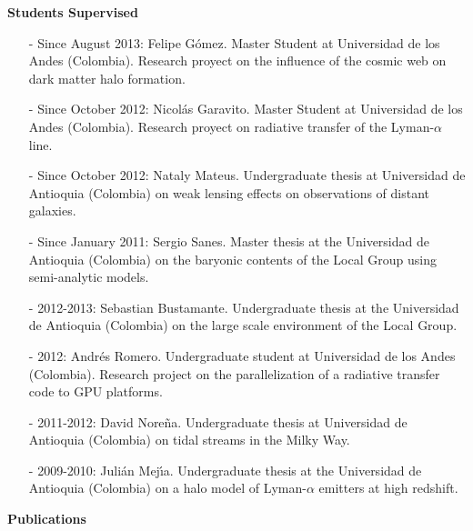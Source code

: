 \documentclass[9pt]{article}
\begin{document}
{\bf Students Supervised}
\begin{itemize}

\item[-] Since August 2013: Felipe G\'omez. Master Student at
  Universidad de los Andes (Colombia). Research proyect on the
  influence of the cosmic web on dark matter halo formation. 
\item[-] Since October 2012: Nicol\'as Garavito. Master Student
  at Universidad de los Andes (Colombia). Research proyect on
  radiative transfer of the  Lyman-$\alpha$ line.  
\item[-] Since October 2012: Nataly Mateus. Undergraduate thesis at
  Universidad de Antioquia (Colombia) on weak lensing effects on
  observations of distant galaxies. 
\item[-] Since January 2011: Sergio Sanes. Master thesis at the
  Universidad de Antioquia (Colombia) on the baryonic contents of the
  Local Group using semi-analytic models. 
\item[-] 2012-2013: Sebastian Bustamante. Undergraduate thesis at the
  Universidad de Antioquia (Colombia) on the large scale environment
  of the Local Group. 
\item[-] 2012: Andr\'es Romero. Undergraduate student at Universidad
  de los Andes (Colombia). Research project on the parallelization of
  a radiative transfer code to GPU platforms. 
\item[-]2011-2012: David Nore\~na. Undergraduate thesis at Universidad
  de Antioquia (Colombia) on tidal streams in the Milky Way. 
\item[-]2009-2010: Juli\'an Mej\'{\i}a. Undergraduate thesis at the
  Universidad de Antioquia (Colombia) on a halo model of
  Lyman-$\alpha$ emitters at high redshift. 
\end{itemize}


{\bf Publications}\\
\end{document}
